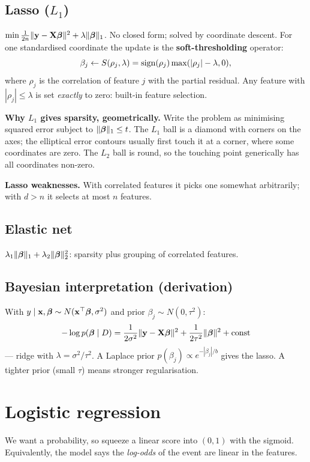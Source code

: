 \subsection{Lasso (\texorpdfstring{$L_1$}{L1})}
$\min\frac1{2n}\|\mathbf{y}-\mathbf{X}\bm{\beta}\|^2+\lambda\|\bm{\beta}\|_1$. No closed form; solved by coordinate descent. For one standardised coordinate the update is the \textbf{soft-thresholding} operator:
\[\beta_j\leftarrow S(\rho_j,\lambda)=\operatorname{sign}(\rho_j)\max(|\rho_j|-\lambda,0),\]
where $\rho_j$ is the correlation of feature $j$ with the partial residual. Any feature with $|\rho_j|\le\lambda$ is set \emph{exactly} to zero: built-in feature selection.

\textbf{Why $L_1$ gives sparsity, geometrically.} Write the problem as minimising squared error subject to $\|\bm{\beta}\|_1\le t$. The $L_1$ ball is a diamond with corners on the axes; the elliptical error contours usually first touch it at a corner, where some coordinates are zero. The $L_2$ ball is round, so the touching point generically has all coordinates non-zero.

\textbf{Lasso weaknesses.} With correlated features it picks one somewhat arbitrarily; with $d>n$ it selects at most $n$ features.

\subsection{Elastic net}
$\lambda_1\|\bm{\beta}\|_1+\lambda_2\|\bm{\beta}\|_2^2$: sparsity plus grouping of correlated features.

\subsection{Bayesian interpretation (derivation)}
With $y\mid\mathbf{x},\bm{\beta}\sim N(\mathbf{x}^\top\bm{\beta},\sigma^2)$ and prior $\beta_j\sim N(0,\tau^2)$:
\[-\log p(\bm{\beta}\mid D)=\frac1{2\sigma^2}\|\mathbf{y}-\mathbf{X}\bm{\beta}\|^2+\frac1{2\tau^2}\|\bm{\beta}\|^2+\text{const}\]
--- ridge with $\lambda=\sigma^2/\tau^2$. A Laplace prior $p(\beta_j)\propto e^{-|\beta_j|/b}$ gives the lasso. A tighter prior (small $\tau$) means stronger regularisation.

\section{Logistic regression}

\begin{intuition}
We want a probability, so squeeze a linear score into $(0,1)$ with the sigmoid. Equivalently, the model says the \emph{log-odds} of the event are linear in the features.
\end{intuition}

